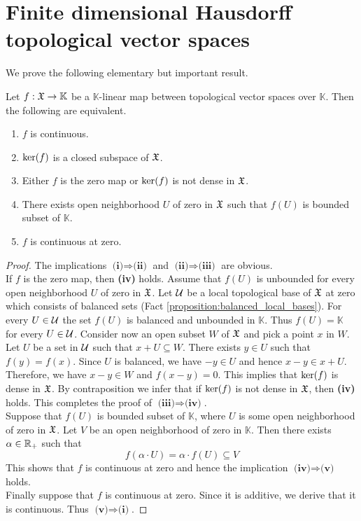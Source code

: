 \section{Finite dimensional Hausdorff topological vector spaces}
\noindent
We prove the following elementary but important result.

\begin{proposition}\label{proposition:criteria_for_continuity_of_linear_functionals}
Let $f:{\mathfrak X} \rightarrow \mathbb{K}$ be a $\mathbb{K}$-linear map between topological vector spaces over $\mathbb{K}$. Then the following are equivalent.
\begin{enumerate}[label=\emph{\textbf{(\roman*)}}, leftmargin=*]
\item $f$ is continuous.
\item $\mathrm{ker}(f)$ is a closed subspace of ${\mathfrak X}$.
\item Either $f$ is the zero map or $\mathrm{ker}(f)$ is not dense in ${\mathfrak X}$.
\item There exists open neighborhood $U$ of zero in ${\mathfrak X}$ such that $f(U)$ is bounded subset of $\mathbb{K}$.
\item $f$ is continuous at zero.
\end{enumerate}
\end{proposition}
\begin{proof}
The implications $\textbf{(i)}\Rightarrow \textbf{(ii)}$ and $\textbf{(ii)}\Rightarrow \textbf{(iii)}$ are obvious.\\
If $f$ is the zero map, then \textbf{(iv)} holds. Assume that $f(U)$ is unbounded for every open neighborhood $U$ of zero in ${\mathfrak X}$. Let ${\mathcal U}$ be a local topological base of ${\mathfrak X}$ at zero which consists of balanced sets (Fact \ref{proposition:balanced_local_bases}). For every $U\in {\mathcal U}$ the set $f(U)$ is balanced and unbounded in $\mathbb{K}$. Thus $f(U) = \mathbb{K}$ for every $U\in {\mathcal U}$. Consider now an open subset $W$ of ${\mathfrak X}$ and pick a point $x$ in $W$. Let $U$ be a set in ${\mathcal U}$ such that $x+U\subseteq W$. There exists $y \in U$ such that $f(y) = f(x)$. Since $U$ is balanced, we have $-y\in U$ and hence $x - y \in x+U$. Therefore, we have $x-y\in W$ and $f(x-y)=0$. This implies that $\mathrm{ker}(f)$ is dense in ${\mathfrak X}$. By contraposition we infer that if $\mathrm{ker}(f)$ is not dense in ${\mathfrak X}$, then \textbf{(iv)} holds. This completes the proof of $\textbf{(iii)}\Rightarrow \textbf{(iv)}$.\\
Suppose that $f(U)$ is bounded subset of $\mathbb{K}$, where $U$ is some open neighborhood of zero in ${\mathfrak X}$. Let $V$ be an open neighborhood of zero in $\mathbb{K}$. Then there exists $\alpha \in {\mathbb R}_+$ such that 
$$f\left(\alpha \cdot U\right) = \alpha \cdot f(U)\subseteq V$$
This shows that $f$ is continuous at zero and hence the implication $\textbf{(iv)}\Rightarrow \textbf{(v)}$ holds.\\
Finally suppose that $f$ is continuous at zero. Since it is additive, we derive that it is continuous. Thus $\textbf{(v)}\Rightarrow \textbf{(i)}$. 
\end{proof}

